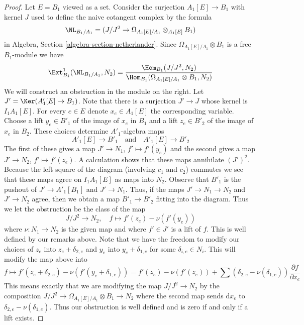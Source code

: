 \begin{proof}
Let $E = B_1$ viewed as a set.
Consider the surjection $A_1[E] \to B_1$ with kernel $J$ used
to define the naive cotangent complex by the formula
$$
\NL_{B_1/A_1} = (J/J^2 \to \Omega_{A_1[E]/A_1} \otimes_{A_1[E]} B_1)
$$
in
Algebra, Section \ref{algebra-section-netherlander}.
Since $\Omega_{A_1[E]/A_1} \otimes B_1$ is a free
$B_1$-module we have
$$
\Ext^1_{B_1}(\NL_{B_1/A_1}, N_2) =
\frac{\Hom_{B_1}(J/J^2, N_2)}
{\Hom_{B_1}(\Omega_{A_1[E]/A_1} \otimes B_1, N_2)}
$$
We will construct an obstruction in the module on the right.
Let $J' = \Ker(A'_1[E] \to B_1)$. Note that there is a surjection
$J' \to J$ whose kernel is $I_1A_1[E]$.
For every $e \in E$ denote $x_e \in A_1[E]$ the corresponding variable.
Choose a lift $y_e \in B'_1$ of the image of $x_e$ in $B_1$ and
a lift $z_e \in B'_2$ of the image of $x_e$ in $B_2$.
These choices determine $A'_1$-algebra maps
$$
A'_1[E] \to B'_1 \quad\text{and}\quad A'_1[E] \to B'_2
$$
The first of these gives a map $J' \to N_1$, $f' \mapsto f'(y_e)$
and the second gives a map $J' \to N_2$, $f' \mapsto f'(z_e)$.
A calculation shows that these maps annihilate $(J')^2$.
Because the left square of the diagram (involving $c_1$ and $c_2$)
commutes we see that these maps agree on $I_1A_1[E]$ as maps into $N_2$.
Observe that $B'_1$ is the pushout of $J' \to A'_1[B_1]$ and $J' \to N_1$. 
Thus, if the maps $J' \to N_1 \to N_2$ and $J' \to N_2$ agree, then we
obtain a map $B'_1 \to B'_2$ fitting into the diagram.
Thus we let the obstruction be the class of the map
$$
J/J^2 \to N_2,\quad f \mapsto f'(z_e) - \nu(f'(y_e))
$$
where $\nu : N_1 \to N_2$ is the given map and where $f' \in J'$
is a lift of $f$. This is well defined by our remarks above.
Note that we have the freedom
to modify our choices of $z_e$ into $z_e + \delta_{2, e}$
and $y_e$ into $y_e + \delta_{1, e}$ for some $\delta_{i, e} \in N_i$.
This will modify the map above into
$$
f \mapsto f'(z_e + \delta_{2, e}) - \nu(f'(y_e + \delta_{1, e})) =
f'(z_e) - \nu(f'(z_e)) +
\sum (\delta_{2, e} - \nu(\delta_{1, e}))\frac{\partial f}{\partial x_e}
$$
This means exactly that we are modifying the map $J/J^2 \to N_2$
by the composition $J/J^2 \to \Omega_{A_1[E]/A_1} \otimes B_1 \to N_2$
where the second map sends $\text{d}x_e$ to
$\delta_{2, e} - \nu(\delta_{1, e})$. Thus our obstruction is well defined
and is zero if and only if a lift exists.


\end{proof}
